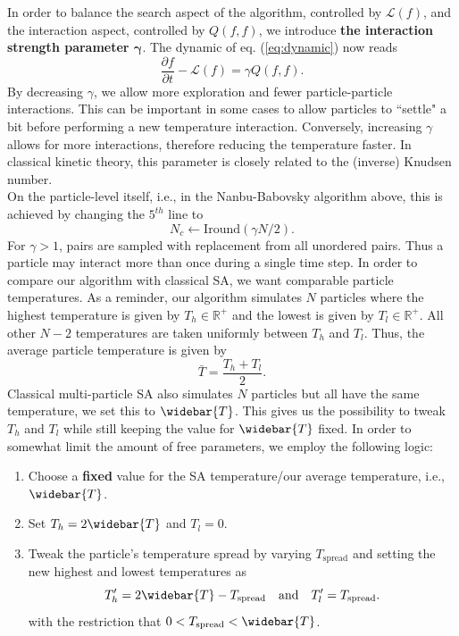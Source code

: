 \documentclass[10pt,a4paper]{article}
\theoremstyle{theorem}
\numberwithin{equation}{section}
\begin{document}
In order to balance the search aspect of the algorithm, controlled by $\mathcal{L}(f)$, and the interaction aspect, controlled by $Q(f,f)$, we introduce \textbf{the interaction strength parameter $\bm{\gamma}$}. The dynamic of eq. (\ref{eq:dynamic}) now reads
\begin{equation}
\label{eq:dynamic_scaled}
\frac{\partial f}{\partial t}-\mathcal{L}(f)=\gamma Q(f,f).
\end{equation}
By decreasing $\gamma$, we allow more exploration and fewer particle-particle interactions.  This can be important in some cases to allow particles to ``settle" a bit before performing a new temperature interaction. Conversely, increasing $\gamma$ allows for more interactions, therefore reducing the temperature faster. In classical kinetic theory, this parameter is closely related to the (inverse) Knudsen number.
\\
On the particle-level itself, i.e., in the Nanbu-Babovsky algorithm above, this is achieved by changing the $5^{th}$ line to 
\begin{equation*}
N_c\leftarrow \text{Iround}(\gamma N/2).
\end{equation*} 
For \(\gamma>1\), pairs are sampled with replacement from all unordered pairs.
Thus a particle may interact more than once during a single time step.
In order to compare our algorithm with classical SA, we want comparable particle temperatures. As a reminder, our algorithm simulates $N$ particles where the highest temperature is given by $T_h\in\mathbb{R}^+$ and the lowest is given by $T_l\in\mathbb{R}^+$. All other $N-2$ temperatures are taken uniformly between $T_h$ and $T_l$. Thus, the average particle temperature is given by 
\begin{equation*}
\bar{T} = \frac{T_h+T_l}{2}.
\end{equation*}
Classical multi-particle SA also simulates $N$ particles but all have the same temperature, we set this to $\widebar{T}$. This gives us the possibility to tweak $T_h$ and $T_l$ while still keeping the value for $\widebar{T}$ fixed. In order to somewhat limit the amount of free parameters, we employ the following logic:
\begin{enumerate}
\item Choose a \textbf{fixed} value for the SA temperature/our average temperature, i.e., $\widebar{T}$.
\item Set $T_h=2\widebar{T}$ and $T_l=0$.
\item Tweak the particle's temperature spread by varying $T_{\mathrm{spread}}$ and setting the new highest and lowest temperatures as
\begin{equation}
\label{eq:tvar}
T_h'=2\widebar{T}-T_{\mathrm{spread}}\quad \text{and} \quad T_l'=T_{\mathrm{spread}}.
\end{equation}
with the restriction that $0<T_{\mathrm{spread}}<\widebar{T}$.
\end{enumerate}
\end{document}
